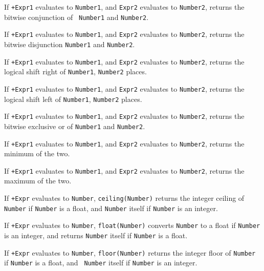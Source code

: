 \begin{description}
%
 If {\tt +Expr1} evaluates to {\tt Number1}, and {\tt Expr2}
evaluates to {\tt Number2}, returns the bitwise conjunction of {\tt
Number1} and {\tt Number2}.


%
If {\tt +Expr1} evaluates to {\tt Number1}, and {\tt Expr2} evaluates
to {\tt Number2}, returns the bitwise disjunction {\tt Number1} and
{\tt Number2}.

%
If {\tt +Expr1} evaluates to {\tt Number1}, and {\tt Expr2} evaluates
to {\tt Number2}, returns the logical shift right of {\tt Number1},
{\tt Number2} places.

%
If {\tt +Expr1} evaluates to {\tt Number1}, and {\tt Expr2}
evaluates to {\tt Number2}, returns the logical shift left of 
{\tt Number1}, {\tt Number2} places.

%
If {\tt +Expr1} evaluates to {\tt Number1}, and {\tt Expr2}
evaluates to {\tt Number2}, returns the bitwise exclusive or of 
{\tt Number1} and {\tt Number2}.

%
If {\tt +Expr1} evaluates to {\tt Number1}, and
{\tt Expr2} evaluates to {\tt Number2}, returns the minimum of the
two.

%
If {\tt +Expr1} evaluates to {\tt Number1}, and
{\tt Expr2} evaluates to {\tt Number2}, returns the maximum of the
two.

%
If {\tt +Expr} evaluates to {\tt Number}, {\tt ceiling(Number)}
returns the integer ceiling of {\tt Number} if {\tt Number} is a
float, and {\tt Number} itself if {\tt Number} is an integer.

%
If {\tt +Expr} evaluates to {\tt Number}, {\tt float(Number)} converts
{\tt Number} to a float if {\tt Number} is an integer, and returns
{\tt Number} itself if {\tt Number} is a float.

%
If {\tt +Expr} evaluates to {\tt Number}, {\tt floor(Number)} returns
the integer floor of {\tt Number} if {\tt Number} is a float, and {\tt
  Number} itself if {\tt Number} is an integer.


\end{description}
